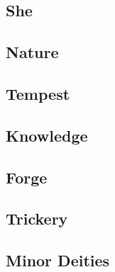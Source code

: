 

\subsection{She}


\subsection{Nature}


\subsection{Tempest}


\subsection{Knowledge}


\subsection{Forge}


\subsection{Trickery}


\subsection{Minor Deities}

